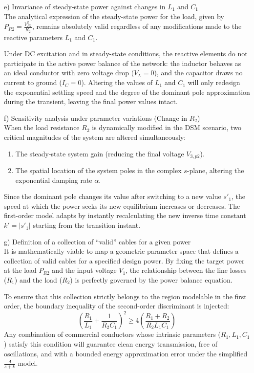\documentclass[energies,accept,oneauthor,pdftex]{Definitions/mdpi}
\begin{document}
\medskip\noindent
e) Invariance of steady-state power against changes in $L_1$ and $C_1$\\
The analytical expression of the steady-state power for the load, given by $P_{R2} = \frac{V_{R2}^2}{R_2}$, remains absolutely valid regardless of any modifications made to the reactive parameters $L_1$ and $C_1$.

Under DC excitation and in steady-state conditions, the reactive elements do not participate in the active power balance of the network: the inductor behaves as an ideal conductor with zero voltage drop ($V_L = 0$), and the capacitor draws no current to ground ($I_C = 0$). Altering the values of $L_1$ and $C_1$ will only redesign the exponential settling speed and the degree of the dominant pole approximation during the transient, leaving the final power values intact.

\medskip\noindent
f) Sensitivity analysis under parameter variations (Change in $R_2$) \\
When the load resistance $R_2$ is dynamically modified in the DSM scenario, two critical magnitudes of the system are altered simultaneously:
\begin{enumerate}
    \item The steady-state system gain (reducing the final voltage $V_{3,p2}$).
    \item The spatial location of the system poles in the complex $s$-plane, altering the exponential damping rate $\alpha$.
\end{enumerate}
Since the dominant pole changes its value after switching to a new value $s'_1$, the speed at which the power seeks its new equilibrium increases or decreases. The first-order model adapts by instantly recalculating the new inverse time constant $k' = |s'_1|$ starting from the transition instant.

\medskip\noindent
g) Definition of a collection of ``valid'' cables for a given power \\
It is mathematically viable to map a geometric parameter space that defines a collection of valid cables for a specified design power. By fixing the target power at the load $P_{R2}$ and the input voltage $V_1$, the relationship between the line losses ($R_1$) and the load ($R_2$) is perfectly governed by the power balance equation.

To ensure that this collection strictly belongs to the region modelable in the first order, the boundary inequality of the second-order discriminant is injected:
\[ \left( \frac{R_1}{L_1} + \frac{1}{R_2C_1} \right)^2 \ge 4 \left( \frac{R_1 + R_2}{R_2L_1C_1} \right) \]
Any combination of commercial conductors whose intrinsic parameters ($R_1, L_1, C_1$) satisfy this condition will guarantee clean energy transmission, free of oscillations, and with a bounded energy approximation error under the simplified $\frac{A}{s+k}$ model.
\end{document}

